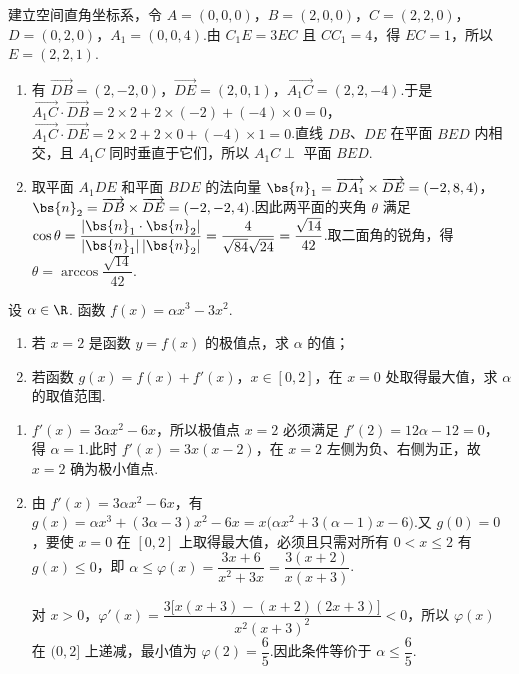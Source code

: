 \begin{solution}
建立空间直角坐标系，令
\(A=(0,0,0)\)，\(B=(2,0,0)\)，\(C=(2,2,0)\)，\(D=(0,2,0)\)，\(A_1=(0,0,4)\).由 \(C_1E=3EC\) 且 \(CC_1=4\)，得 \(EC=1\)，所以 \(E=(2,2,1)\).

\begin{enumerate}
\item 有 \(\overrightarrow{DB}=(2,-2,0)\)，\(\overrightarrow{DE}=(2,0,1)\)，\(\overrightarrow{A_1C}=(2,2,-4)\).于是
\(\overrightarrow{A_1C}\cdot\overrightarrow{DB}=2\times2+2\times(-2)+(-4)\times0=0\)，
\(\overrightarrow{A_1C}\cdot\overrightarrow{DE}=2\times2+2\times0+(-4)\times1=0\).直线 \(DB\)、\(DE\) 在平面 \(BED\) 内相交，且 \(A_1C\) 同时垂直于它们，所以 \(A_1C\perp\) 平面 \(BED\).
\item 取平面 \(A_1DE\) 和平面 \(BDE\) 的法向量
\(\bs{n}_1=\overrightarrow{DA_1}\times\overrightarrow{DE}=(-2,8,4)\)，\(\bs{n}_2=\overrightarrow{DB}\times\overrightarrow{DE}=(-2,-2,4)\).因此两平面的夹角 \(\theta\) 满足
\(\cos\theta=\dfrac{|\bs{n}_1\cdot\bs{n}_2|}{|\bs{n}_1|\,|\bs{n}_2|}=\dfrac{4}{\sqrt{84}\sqrt{24}}=\dfrac{\sqrt{14}}{42}\).取二面角的锐角，得 \(\theta=\arccos\dfrac{\sqrt{14}}{42}\).
\end{enumerate}
\end{solution}

\begin{problem}
设 \(\alpha \in \R\). 函数 \(f(x) = \alpha x^3 - 3x^2\).

\begin{enumerate}
\item 若 \(x = 2\) 是函数 \(y = f(x)\) 的极值点，求 \(\alpha\) 的值；
\item 若函数 \(g(x) = f(x) + f'(x)\)，\(x \in [0,2]\)，在 \(x = 0\) 处取得最大值，求 \(\alpha\) 的取值范围.
\end{enumerate}
\end{problem}

\begin{solution}
\begin{enumerate}
\item \(f'(x)=3\alpha x^2-6x\)，所以极值点 \(x=2\) 必须满足 \(f'(2)=12\alpha-12=0\)，得 \(\alpha=1\).此时 \(f'(x)=3x(x-2)\)，在 \(x=2\) 左侧为负、右侧为正，故 \(x=2\) 确为极小值点.
\item 由 \(f'(x)=3\alpha x^2-6x\)，有
\(g(x)=\alpha x^3+(3\alpha-3)x^2-6x=x\bigl(\alpha x^2+3(\alpha-1)x-6\bigr)\).又 \(g(0)=0\)，要使 \(x=0\) 在 \([0,2]\) 上取得最大值，必须且只需对所有 \(0<x\leqslant2\) 有 \(g(x)\leqslant0\)，即
\(\alpha\leqslant\varphi(x)=\dfrac{3x+6}{x^2+3x}=\dfrac{3(x+2)}{x(x+3)}\).

对 \(x>0\)，\(\varphi'(x)=\dfrac{3\bigl[x(x+3)-(x+2)(2x+3)\bigr]}{x^2(x+3)^2}<0\)，所以 \(\varphi(x)\) 在 \((0,2]\) 上递减，最小值为 \(\varphi(2)=\dfrac65\).因此条件等价于 \(\alpha\leqslant\dfrac65\).
\end{enumerate}
\end{solution}


